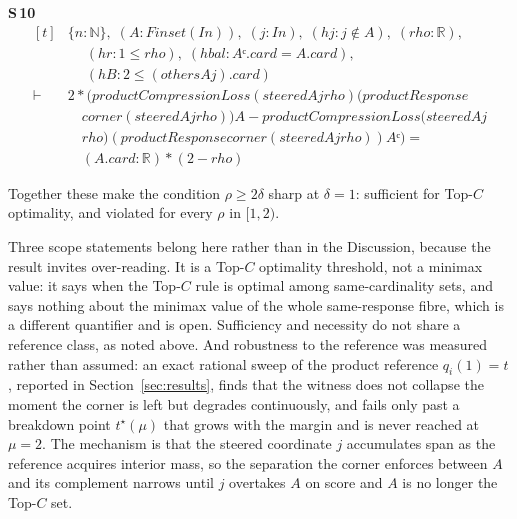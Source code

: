 \noindent\textbf{S\,10}\quad{}
{\footnotesize\[ \begin{aligned}[t]
&\{ \mathit{n} : \mathbb{N} \},\; (\mathit{A} : \mathit{Finset} (\mathit{I} \mathit{n})),\; (\mathit{j} : \mathit{I} \mathit{n}),\; (\mathit{hj} : \mathit{j} \notin \mathit{A}),\; (\mathit{rho} : \mathbb{R} ),\\
&\quad \; (\mathit{hr} : 1 \leq \mathit{rho}),\; (\mathit{hbal} : \mathit{Aᶜ}.\mathit{card}=\mathit{A}.\mathit{card}),\\
&\quad \; (\mathit{hB} : 2 \leq (\mathit{others} \mathit{A} \mathit{j}).\mathit{card})\\
\vdash\;&2*(\mathit{productCompressionLoss} (\mathit{steered} \mathit{A} \mathit{j} \mathit{rho}) (\mathit{productResponse}\\
&\quad \mathit{corner} (\mathit{steered} \mathit{A} \mathit{j} \mathit{rho})) \mathit{A}- \mathit{productCompressionLoss} (\mathit{steered} \mathit{A} \mathit{j}\\
&\quad \mathit{rho}) (\mathit{productResponse} \mathit{corner} (\mathit{steered} \mathit{A} \mathit{j} \mathit{rho})) \mathit{Aᶜ})=\\
&\quad (\mathit{A}.\mathit{card}:\mathbb{R} )*(2-\mathit{rho})
\end{aligned} \]}


Together these make the condition $\rho\ge2\delta$ sharp at $\delta=1$: sufficient for
Top-$C$ optimality, and violated for every $\rho$ in $[1,2)$.

Three scope statements belong here rather than in the Discussion, because the result invites
over-reading. It is a Top-$C$ optimality threshold, not a minimax value: it says when the
Top-$C$ rule is optimal among same-cardinality sets, and says nothing about the minimax value
of the whole same-response fibre, which is a different quantifier and is open. Sufficiency and
necessity do not share a reference class, as noted above. And robustness to the reference
was measured rather than assumed: an exact rational sweep of the product reference
$q_{i}(1)=t$, reported in Section~\ref{sec:results}, finds that the witness does not collapse
the moment the corner is left but degrades continuously, and fails only past a breakdown point
$t^{\star}(\mu)$ that grows with the margin and is never reached at $\mu=2$. The mechanism is
that the steered coordinate $j$ accumulates span as the reference acquires interior mass, so
the separation the corner enforces between $A$ and its complement narrows until $j$ overtakes
$A$ on score and $A$ is no longer the Top-$C$ set.

